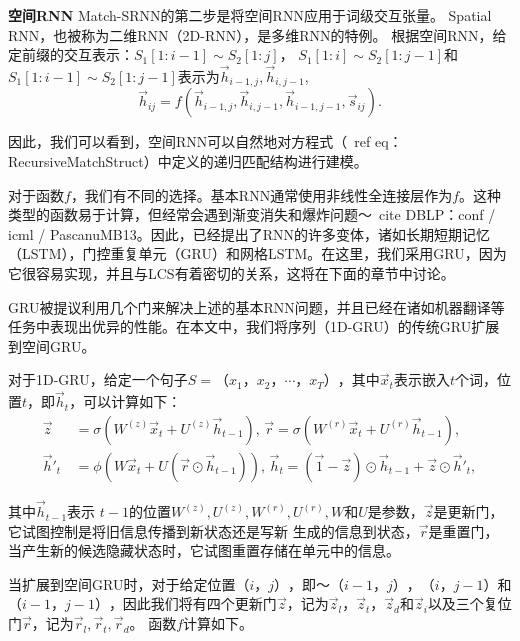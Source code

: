 \textbf{空间RNN}
Match-SRNN的第二步是将空间RNN应用于词级交互张量。 Spatial RNN，也被称为二维RNN（2D-RNN），是多维RNN的特例。 根据空间RNN，给定前缀的交互表示：$S_1[1{:}i{-}1]\!{\sim}\! S_2[1{:}j]$， $S_1[1{:}i]\!{\sim}\! S_2[1{:}j{-}1]$和$S_1[1{:}i{-}1]\!{\sim}\! S_2[1{:}j{-}1]$表示为$\vec{h}_{i-1,j},\vec{h}_{i,j-1}$,
\begin{equation}
\vec{h}_{ij}=f(\vec{h}_{i-1,j},\vec{h}_{i,j-1},\vec{h}_{i-1,j-1},\vec{s}_{ij}).
\end{equation}

因此，我们可以看到，空间RNN可以自然地对方程式（\ ref {eq：RecursiveMatchStruct}）中定义的递归匹配结构进行建模。

对于函数$ f $，我们有不同的选择。基本RNN通常使用非线性全连接层作为$ f $。这种类型的函数易于计算，但经常会遇到渐变消失和爆炸问题〜\ cite {DBLP：conf / icml / PascanuMB13}。因此，已经提出了RNN的许多变体，诸如长期短期记忆（LSTM），门控重复单元（GRU）和网格LSTM。在这里，我们采用GRU，因为它很容易实现，并且与LCS有着密切的关系，这将在下面的章节中讨论。

GRU被提议利用几个门来解决上述的基本RNN问题，并且已经在诸如机器翻译等任务中表现出优异的性能。在本文中，我们将序列（1D-GRU）的传统GRU扩展到空间GRU。

对于1D-GRU，给定一个句子$ S {=}（x_1，x_2，\cdots，x_T）$，其中$ \vec {x} _t $表示嵌入$ t $个词，位置$ t $，即$ \vec {h} _t $，可以计算如下：
\begin{equation*}
	\begin{aligned}
		\vec{z} \,& {=} \sigma(W^{(z)}\vec{x}_t + U^{(z)}\vec{h}_{t-1}),\,\vec{r}{=} \sigma(W^{(r)}\vec{x}_t + U^{(r)}\vec{h}_{t-1}), \\
		\vec{h}'_t \,&{=} \phi(W\vec{x}_t{+}U(\vec{r}\odot \vec{h}_{t-1})),\,\vec{h}_t{=} (\vec{1}-\vec{z})\odot \vec{h}_{t-1} {+} \vec{z} \odot \vec{h}'_t,
	\end{aligned}
\end{equation*}

其中$ \vec {h} _ {t-1} $表示 $t{-}1$的位置$W^{(z)},U^{(z)},W^{(r)},U^{(r)},W$和$ U $是参数，$ \vec {z} $是更新门，它试图控制是将旧信息传播到新状态还是写新 生成的信息到状态，$ \vec {r} $是重置门，当产生新的候选隐藏状态时，它试图重置存储在单元中的信息。

当扩展到空间GRU时，对于给定位置$（i，j）$，即〜$（i { - } 1，j），（i，j { - } 1）$和$ （i { - } 1，j { - } 1）$，因此我们将有四个更新门$ \vec {z} $，记为$ \vec {z} _ {l}，\vec {z} _t ，\vec {z} _d $和$ \vec {z} _i $以及三个复位门$ \vec {r} $，记为$\vec{r}_l, \vec{r}_t, \vec{r}_d$。 函数$ f $计算如下。

